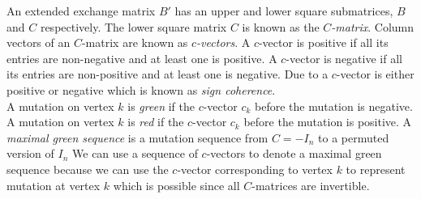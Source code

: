 \indent An extended exchange matrix $B'$ has an upper and lower square submatrices, $B$ and $C$ respectively. The lower square matrix $C$ is known as the $C$\textit{-matrix}. Column vectors of an $C$-matrix are known as $c$\textit{-vectors}. A $c$-vector is positive if all its entries are non-negative and at least one is positive. A $c$-vector is negative if all its entries are non-positive and at least one is negative. Due to \cite{GHKK14} a $c$-vector is either positive or negative which is known as \textit{sign coherence}.\\
\indent A mutation on vertex $k$ is \textit{green} if the $c$-vector $c_k$ before the mutation is negative.  A mutation on vertex $k$ is \textit{red} if the $c$-vector $c_k$ before the mutation is positive. A \textit{maximal green sequence} is a mutation sequence from $C=-I_n$ to a permuted version of $I_n$ We can use a sequence of $c$-vectors to denote a maximal green sequence because we can use the $c$-vector corresponding to vertex $k$ to represent mutation at vertex $k$ which is possible since all $C$-matrices are invertible.\\
